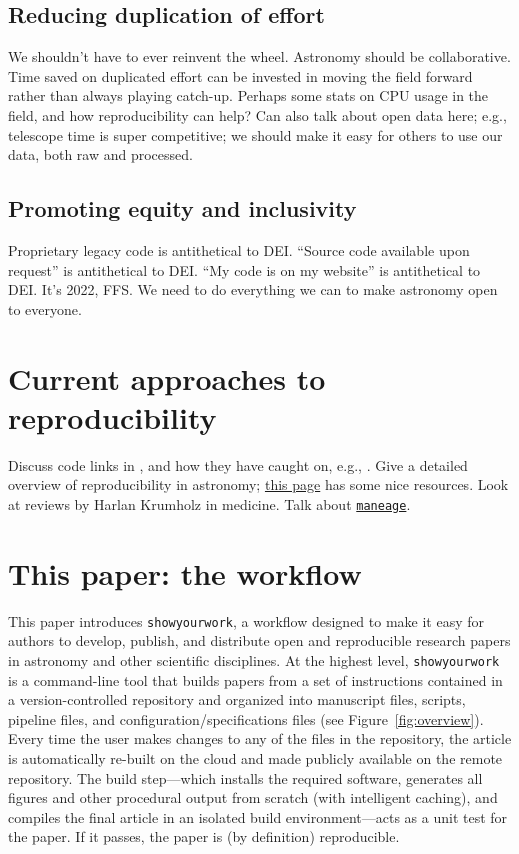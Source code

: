 \documentclass{aastex631}
\newcommand\xxx[1]{{\color{red}#1}}
\newcommand\syw{\texttt{showyourwork}\xspace}
\begin{document}
\subsection{Reducing duplication of effort}
\label{sec:args:duplication}
\xxx{We shouldn't have to ever reinvent the wheel. Astronomy should be collaborative. Time saved on duplicated effort can be invested in moving the field forward rather than always playing catch-up.}
%
\xxx{Perhaps some stats on CPU usage in the field, and how reproducibility can help?}
%
\xxx{Can also talk about open data here; e.g., telescope time is super competitive; we should make it easy for others to use our data, both raw and processed.}

\subsection{Promoting equity and inclusivity}
\label{sec:args:dei}
\xxx{Proprietary legacy code is antithetical to DEI. ``Source code available upon request'' is antithetical to DEI. ``My code is on my website'' is antithetical to DEI. It's 2022, FFS. We need to do everything we can to make astronomy open to everyone.}


\section{Current approaches to reproducibility}
\label{sec:intro:curr}
\xxx{Discuss code links in \citet{Luger2019,Luger2021a,Luger2021b}, and how they have caught on, e.g., \citet{Paillas2022}.} 
%
\xxx{Give a detailed overview of reproducibility in astronomy; \href{https://maneage.org/pdf/slides-intro.pdf}{this page} has some nice resources. Look at reviews by Harlan Krumholz in medicine. Talk about \texttt{\href{https://maneage.org}{maneage}}.}
%

\section{This paper: the \showyourwork workflow}
\label{sec:intro:syw}
This paper introduces \syw, a workflow designed to make it easy for authors to develop, publish, and distribute open and reproducible research papers in astronomy and other scientific disciplines. 
At the highest level, \syw is a command-line tool that builds papers from a set of instructions contained in a version-controlled repository and organized into manuscript files, scripts, pipeline files, and configuration/specifications files (see Figure~\ref{fig:overview}).
Every time the user makes changes to any of the files in the repository, the article is automatically re-built on the cloud and made publicly available on the remote repository.
The build step---which installs the required software, generates all figures and other procedural output from scratch (with intelligent caching), and compiles the final article in an isolated build environment---acts as a unit test for the paper. 
If it passes, the paper is (by definition) reproducible.
\end{document}
